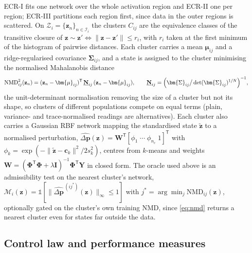 ECR-I fits one network over the whole activation region and ECR-II one per
region; ECR-III partitions each region first, since data in the outer regions
is scattered. On $\mathcal{Z}_i=\{\mathbf{z}_n\}_{n\in\mathcal{I}_i}$ the clusters
$C_{ij}$ are the equivalence classes of the transitive closure of
$\mathbf{z}\sim\mathbf{z}'\iff\|\mathbf{z}-\mathbf{z}'\|\le r_i$, with $r_i$
taken at the first minimum of the histogram of pairwise distances. Each cluster
carries a mean $\bm{\mu}_{ij}$ and a ridge-regularised covariance
$\bm{\Sigma}_{ij}$, and a state is assigned to the cluster minimising the
normalised Mahalanobis distance
%
\begin{equation}
\mathrm{NMD}^{2}_{ij}(\mathbf{z}_n)=(\mathbf{z}_n-\bm{\mu}_{ij})^{\mathsf T}\,
\underline{\mathbf{N}}_{ij}\,(\mathbf{z}_n-\bm{\mu}_{ij}),
\qquad
\underline{\mathbf{N}}_{ij}=\Bigl(\bm{\Sigma}_{ij}\big/\det(\bm{\Sigma}_{ij})^{1/N}\Bigr)^{-1},
\label{eq:nmd}
\end{equation}
%
the unit-determinant normalisation removing the size of a cluster but not its
shape, so clusters of different populations compete on equal terms (plain,
variance- and trace-normalised readings are alternatives). Each cluster
also carries a Gaussian RBF network mapping the standardised state
$\tilde{\mathbf{z}}$ to a normalised perturbation,
$\widehat{\Delta\mathbf{p}}(\mathbf{z})=\mathbf{W}^{\mathsf T}[\phi_1\;\cdots\;\phi_{n_c}\;1]^{\mathsf T}$
with $\phi_k=\exp(-\|\tilde{\mathbf{z}}-\mathbf{c}_k\|^{2}/2s_k^{2})$, centres
from $k$-means and weights
$\mathbf{W}=(\bm{\Phi}^{\mathsf T}\bm{\Phi}+\lambda\mathbf{I})^{-1}\bm{\Phi}^{\mathsf T}\mathbf{Y}$
in closed form. The oracle used above is an admissibility test on the nearest
cluster's network,
$\mathcal{M}_i(\mathbf{z})=\mathbb{1}[\|\widehat{\Delta\mathbf{p}}^{\,(ij^{*})}(\mathbf{z})\|_{\infty}\le1]$
with $j^{*}=\arg\min_j\mathrm{NMD}_{ij}(\mathbf{z})$, optionally gated on the
cluster's own training NMD, since \eqref{eq:nmd} returns a nearest cluster even
for states far outside the data.

\subsection{Control law and performance measures}
\label{subsec:ecr-online}

